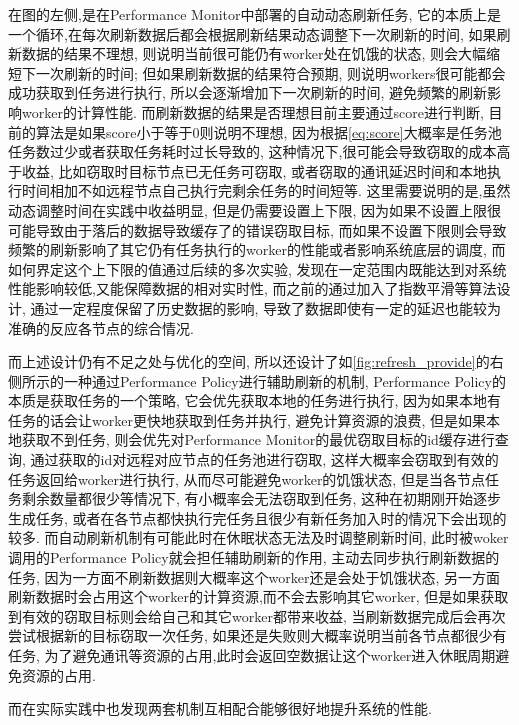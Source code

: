 \documentclass{mproj}
\begin{document}
在图的左侧,是在Performance Monitor中部署的自动动态刷新任务,
它的本质上是一个循环,在每次刷新数据后都会根据刷新结果动态调整下一次刷新的时间,
如果刷新数据的结果不理想,
则说明当前很可能仍有worker处在饥饿的状态,
则会大幅缩短下一次刷新的时间;
但如果刷新数据的结果符合预期,
则说明workers很可能都会成功获取到任务进行执行,
所以会逐渐增加下一次刷新的时间,
避免频繁的刷新影响worker的计算性能.
而刷新数据的结果是否理想目前主要通过score进行判断,
目前的算法是如果score小于等于0则说明不理想,
因为根据\cref{eq:score}大概率是任务池任务数过少或者获取任务耗时过长导致的,
这种情况下,很可能会导致窃取的成本高于收益,
比如窃取时目标节点已无任务可窃取,
或者窃取的通讯延迟时间和本地执行时间相加不如远程节点自己执行完剩余任务的时间短等.
这里需要说明的是,虽然动态调整时间在实践中收益明显,
但是仍需要设置上下限,
因为如果不设置上限很可能导致由于落后的数据导致缓存了的错误窃取目标,
而如果不设置下限则会导致频繁的刷新影响了其它仍有任务执行的worker的性能或者影响系统底层的调度,
而如何界定这个上下限的值通过后续的多次实验,
发现在一定范围内既能达到对系统性能影响较低,又能保障数据的相对实时性,
而之前的通过加入了指数平滑等算法设计,
通过一定程度保留了历史数据的影响,
导致了数据即使有一定的延迟也能较为准确的反应各节点的综合情况.

而上述设计仍有不足之处与优化的空间,
所以还设计了如\cref{fig:refresh_provide}的右侧所示的一种通过Performance Policy进行辅助刷新的机制,
Performance Policy的本质是获取任务的一个策略,
它会优先获取本地的任务进行执行,
因为如果本地有任务的话会让worker更快地获取到任务并执行,
避免计算资源的浪费,
但是如果本地获取不到任务,
则会优先对Performance Monitor的最优窃取目标的id缓存进行查询,
通过获取的id对远程对应节点的任务池进行窃取,
这样大概率会窃取到有效的任务返回给worker进行执行,
从而尽可能避免worker的饥饿状态,
但是当各节点任务剩余数量都很少等情况下,
有小概率会无法窃取到任务,
这种在初期刚开始逐步生成任务,
或者在各节点都快执行完任务且很少有新任务加入时的情况下会出现的较多.
而自动刷新机制有可能此时在休眠状态无法及时调整刷新时间,
此时被woker调用的Performance Policy就会担任辅助刷新的作用,
主动去同步执行刷新数据的任务,
因为一方面不刷新数据则大概率这个worker还是会处于饥饿状态,
另一方面刷新数据时会占用这个worker的计算资源,而不会去影响其它worker,
但是如果获取到有效的窃取目标则会给自己和其它worker都带来收益,
当刷新数据完成后会再次尝试根据新的目标窃取一次任务,
如果还是失败则大概率说明当前各节点都很少有任务,
为了避免通讯等资源的占用,此时会返回空数据让这个worker进入休眠周期避免资源的占用.

而在实际实践中也发现两套机制互相配合能够很好地提升系统的性能.

\end{document}
